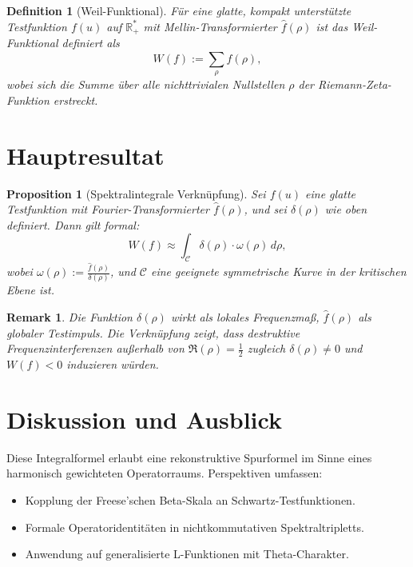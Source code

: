 \documentclass[11pt]{article}
\newtheorem{definition}{Definition}
\newtheorem{proposition}{Proposition}
\newtheorem{remark}{Remark}
\begin{document}
\begin{definition}[Weil-Funktional]
Für eine glatte, kompakt unterstützte Testfunktion \(f(u)\) auf \(\mathbb{R}_+^*\) mit Mellin-Transformierter \(\hat{f}(\rho)\) ist das Weil-Funktional definiert als
\[
W(f) := \sum_\rho \hat{f}(\rho),
\]
wobei sich die Summe über alle nichttrivialen Nullstellen \(\rho\) der Riemann-Zeta-Funktion erstreckt.
\end{definition}

\section{Hauptresultat}

\begin{proposition}[Spektralintegrale Verknüpfung]
Sei \(f(u)\) eine glatte Testfunktion mit Fourier-Transformierter \(\hat{f}(\rho)\), und sei \(\delta(\rho)\) wie oben definiert. Dann gilt formal:
\[
W(f) \approx \int_{\mathcal{C}} \delta(\rho) \cdot \omega(\rho) \, d\rho,
\]
wobei \(\omega(\rho) := \frac{\hat{f}(\rho)}{\delta(\rho)}\), und \(\mathcal{C}\) eine geeignete symmetrische Kurve in der kritischen Ebene ist.
\end{proposition}

\begin{remark}
Die Funktion \(\delta(\rho)\) wirkt als lokales Frequenzmaß, \(\hat{f}(\rho)\) als globaler Testimpuls. Die Verknüpfung zeigt, dass destruktive Frequenzinterferenzen außerhalb von \(\Re(\rho) = \tfrac{1}{2}\) zugleich \(\delta(\rho) \neq 0\) und \(W(f) < 0\) induzieren würden.
\end{remark}

\section{Diskussion und Ausblick}

Diese Integralformel erlaubt eine rekonstruktive Spurformel im Sinne eines harmonisch gewichteten Operatorraums. Perspektiven umfassen:

\begin{itemize}[topsep=3pt]
    \item Kopplung der Freese’schen Beta-Skala an Schwartz-Testfunktionen.
    \item Formale Operatoridentitäten in nichtkommutativen Spektraltripletts.
    \item Anwendung auf generalisierte L-Funktionen mit Theta-Charakter.
\end{itemize}
\end{document}
